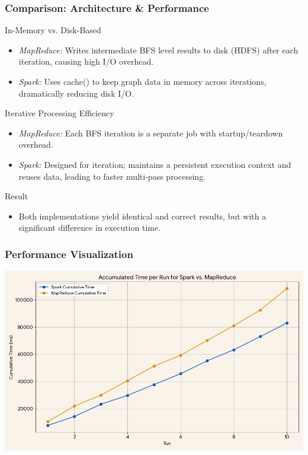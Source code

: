 \documentclass{beamer}
\begin{document}
\begin{frame}[fragile]
    \frametitle{{Comparison: Architecture \& Performance}}

    In-Memory vs. Disk-Based
    \begin{itemize}
        \item \textit{MapReduce:} Writes intermediate BFS level results to disk (HDFS) after each iteration, causing high I/O overhead.
        \item \textit{Spark:} Uses cache() to keep graph data in memory across iterations, dramatically reducing disk I/O.
    \end{itemize}

    Iterative Processing Efficiency
    \begin{itemize}
        \item \textit{MapReduce:} Each BFS iteration is a separate job with startup/teardown overhead.
        \item \textit{Spark:} Designed for iteration; maintains a persistent execution context and reuses data, leading to faster multi-pass processing.
    \end{itemize}

    Result
    \begin{itemize}
        \item Both implementations yield identical and correct results, but with a significant difference in execution time.
    \end{itemize}
\end{frame}

\begin{frame}[fragile]
    \frametitle{{Performance Visualization}}

    \centering
    \includegraphics[width=\columnwidth]{img/MapReduce_vs_Spark.jpg}

\end{frame}
\end{document}
